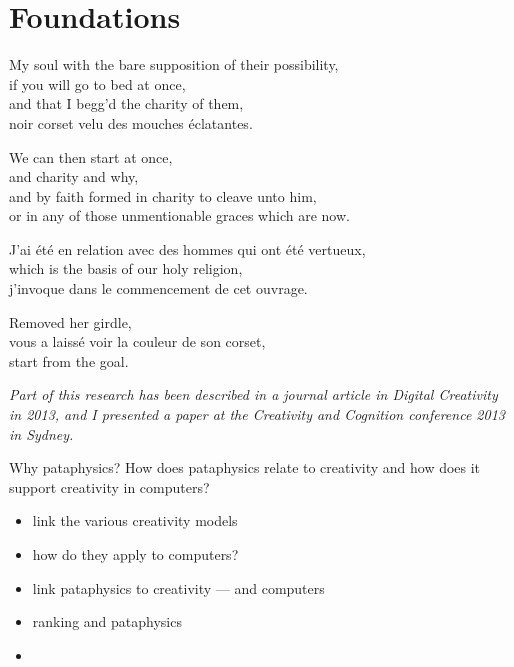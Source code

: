 
\chapter{Foundations}
\label{ch:foundations}

\startcontents[chapters]

My soul with the bare supposition of their possibility, \\
if you will go to bed at once, \\
and that I begg'd the charity of them, \\
noir corset velu des mouches éclatantes.

We can then start at once, \\
and charity and why, \\
and by faith formed in charity to cleave unto him, \\
or in any of those unmentionable graces which are now.

J'ai été en relation avec des hommes qui ont été vertueux, \\
which is the basis of our holy religion, \\
j'invoque dans le commencement de cet ouvrage.

Removed her girdle, \\
vous a laissé voir la couleur de son corset, \\
start from the goal.

\minicontents

\emph{Part of this research has been described in a journal article in Digital Creativity in 2013, and I presented a paper at the Creativity and Cognition conference 2013 in Sydney.}

\grule %

\begin{fcom}
  Why pataphysics? How does pataphysics relate to creativity and how does it support creativity in computers?
\end{fcom}

\begin{draft}
\begin{itemize}
  \item link the various creativity models
  \item how do they apply to computers?
  \item link pataphysics to creativity --- and computers
  \item ranking and pataphysics
  \item
\end{itemize}
\end{draft}


